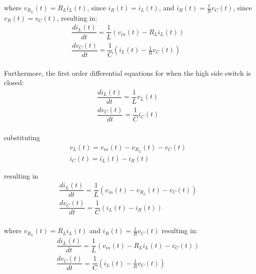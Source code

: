 \documentclass[]{article}
\begin{document}
where $v_{R_{L}}(t) = R_{L}i_{L}(t)$, since $i_{R}(t) = i_{L}(t)$, and $i_{R}(t) = \frac{1}{R}v_{C}(t)$, since $v_{R}(t) = v_{C}(t)$, resulting in:
\begin{equation}
	\begin{array}{l}
		\dfrac{di_{L}(t)}{dt} = \dfrac{1}{L}(v_{in}(t) - R_{L}i_{L}(t)) \\
		\dfrac{dv_{C}(t)}{dt} = \dfrac{1}{C}(i_{L}(t) - \frac{1}{R} v_{C}(t)) \\
	\end{array}
\end{equation}

Furthermore, the first order differential equations for when the high side switch is closed: 
\begin{equation}
	\begin{array}{l}
		\dfrac{di_{L}(t)}{dt} = \dfrac{1}{L} v_{L}(t) \\
		\dfrac{dv_{C}(t)}{dt} = \dfrac{1}{C} i_{C}(t) \\
	\end{array}
\end{equation}

substituting 
\begin{equation}
	\begin{array}{l}
		v_{L}(t) = v_{in}(t) - v_{R_{L}}(t) - v_{C}(t) \\
		i_{C}(t) = i_{L}(t) - i_{R}(t)
	\end{array}
\end{equation}

resulting in
\begin{equation}
	\begin{array}{l}
		\dfrac{di_{L}(t)}{dt} = \dfrac{1}{L} (v_{in}(t) - v_{R_{L}}(t) - v_{C}(t)) \\
		\dfrac{dv_{C}(t)}{dt} = \dfrac{1}{C} (i_{L}(t) - i_{R}(t)) \\
	\end{array}
\end{equation}

where $v_{R_{L}}(t) = R_{L}i_{L}(t)$ and $i_{R}(t) = \frac{1}{R}v_{C}(t)$ resulting in:
\begin{equation}
	\begin{array}{l}
		\dfrac{di_{L}(t)}{dt} = \dfrac{1}{L} (v_{in}(t) - R_{L}i_{L}(t) - v_{C}(t)) \\
		\dfrac{dv_{C}(t)}{dt} = \dfrac{1}{C} (i_{L}(t) - \frac{1}{R}v_{C}(t)) \\
	\end{array}
\end{equation}
\end{document}
